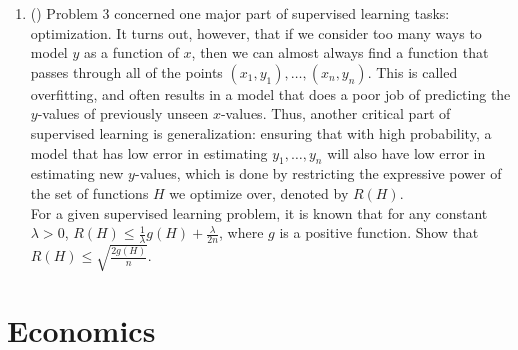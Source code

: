 \documentclass{article}
\begin{document}
\begin{enumerate}
    \item (\textasteriskcentered{}) Problem 3 concerned one major part of supervised learning tasks: optimization. It turns out, however, that if we consider too many ways to model $y$ as a function of $x$, then we can almost always find a function that passes through all of the points $(x_1,y_1),\dots,(x_n,y_n)$. This is called overfitting, and often results in a model that does a poor job of predicting the $y$-values of previously unseen $x$-values. Thus, another critical part of supervised learning is generalization: ensuring that with high probability, a model that has low error in estimating $y_1,\dots,y_n$ will also have low error in estimating new $y$-values, which is done by restricting the expressive power of the set of functions $H$ we optimize over, denoted by $R(H)$. \\

    For a given supervised learning problem, it is known that for any constant $\lambda > 0$, $R(H) \leq \frac{1}{\lambda}g(H) + \frac{\lambda}{2n}$, where $g$ is a positive function. Show that $R(H) \leq \sqrt{\frac{2g(H)}{n}}$. 

    \vfill
    
\end{enumerate}

\section{Economics}
\end{document}
